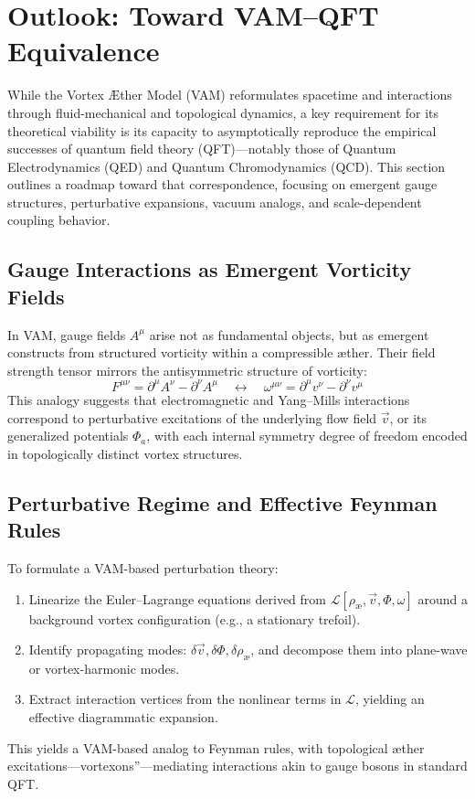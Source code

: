 \section{Outlook: Toward VAM–QFT Equivalence}\label{sec:vam_qft_outlook}

While the Vortex \AE ther Model (VAM) reformulates spacetime and interactions through fluid-mechanical and topological dynamics, a key requirement for its theoretical viability is its capacity to asymptotically reproduce the empirical successes of quantum field theory (QFT)—notably those of Quantum Electrodynamics (QED) and Quantum Chromodynamics (QCD). This section outlines a roadmap toward that correspondence, focusing on emergent gauge structures, perturbative expansions, vacuum analogs, and scale-dependent coupling behavior.

\subsection{Gauge Interactions as Emergent Vorticity Fields}

In VAM, gauge fields \( A^\mu \) arise not as fundamental objects, but as emergent constructs from structured vorticity within a compressible æther. Their field strength tensor mirrors the antisymmetric structure of vorticity:
\begin{equation}
    F^{\mu\nu} = \partial^\mu A^\nu - \partial^\nu A^\mu
    \quad \longleftrightarrow \quad
    \omega^{\mu\nu} = \partial^\mu v^\nu - \partial^\nu v^\mu
\end{equation}
This analogy suggests that electromagnetic and Yang–Mills interactions correspond to perturbative excitations of the underlying flow field \( \vec{v} \), or its generalized potentials \( \Phi_a \), with each internal symmetry degree of freedom encoded in topologically distinct vortex structures.

\subsection{Perturbative Regime and Effective Feynman Rules}

To formulate a VAM-based perturbation theory:
\begin{enumerate}
    \item Linearize the Euler–Lagrange equations derived from \( \mathcal{L}[\rho_\text{\ae}, \vec{v}, \Phi, \omega] \) around a background vortex configuration (e.g., a stationary trefoil).
    \item Identify propagating modes: \( \delta \vec{v}, \delta \Phi, \delta \rho_\text{\ae} \), and decompose them into plane-wave or vortex-harmonic modes.
    \item Extract interaction vertices from the nonlinear terms in \( \mathcal{L} \), yielding an effective diagrammatic expansion.
\end{enumerate}
This yields a VAM-based analog to Feynman rules, with topological æther excitations—\grqq vortexons\textquotedblright—mediating interactions akin to gauge bosons in standard QFT.

